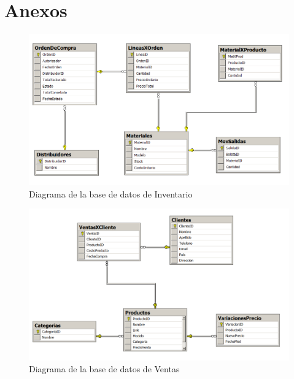 \documentclass{article}
\begin{document}
\section{Anexos}
\begin{figure}[!ht]
  \caption{Diagrama de la base de datos de Inventario}
  \centering
    \includegraphics[width=1\textwidth]{diagInv.PNG}
\end{figure}

\begin{figure}[!ht]
  \caption{Diagrama de la base de datos de Ventas}
  \centering
    \includegraphics[width=1\textwidth]{diagVentas.PNG}
\end{figure}
\end{document}
